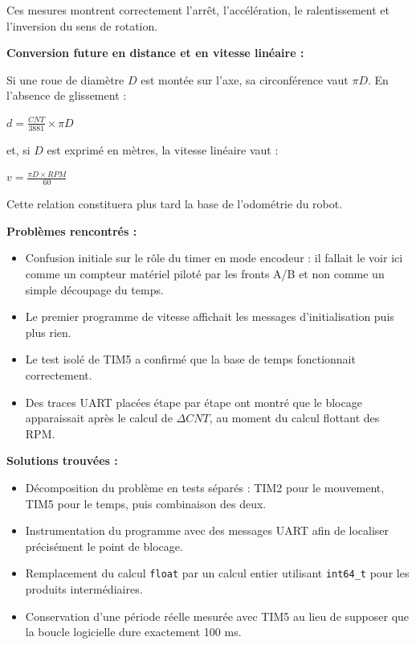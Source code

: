 \documentclass[11pt,a4paper]{article}
\begin{document}
\begin{sessionbox}
		Ces mesures montrent correctement l'arrêt, l'accélération, le ralentissement et l'inversion du sens de rotation.
		
		\vspace{0.3cm}
		
		\textbf{Conversion future en distance et en vitesse linéaire :}
		
		Si une roue de diamètre $D$ est montée sur l'axe, sa circonférence vaut $\pi D$. En l'absence de glissement :
		
		\begin{center}
			$d = \frac{CNT}{3881} \times \pi D$
		\end{center}
		
		et, si $D$ est exprimé en mètres, la vitesse linéaire vaut :
		
		\begin{center}
			$v = \frac{\pi D \times RPM}{60}$
		\end{center}
		
		Cette relation constituera plus tard la base de l'odométrie du robot.
		
		\vspace{0.3cm}
		
		\textbf{Problèmes rencontrés :}
		
		\begin{itemize}
			\item Confusion initiale sur le rôle du timer en mode encodeur : il fallait le voir ici comme un compteur matériel piloté par les fronts A/B et non comme un simple découpage du temps.
			\item Le premier programme de vitesse affichait les messages d'initialisation puis plus rien.
			\item Le test isolé de TIM5 a confirmé que la base de temps fonctionnait correctement.
			\item Des traces UART placées étape par étape ont montré que le blocage apparaissait après le calcul de $\Delta CNT$, au moment du calcul flottant des RPM.
		\end{itemize}
		
		\vspace{0.3cm}
		
		\textbf{Solutions trouvées :}
		
		\begin{itemize}
			\item Décomposition du problème en tests séparés : TIM2 pour le mouvement, TIM5 pour le temps, puis combinaison des deux.
			\item Instrumentation du programme avec des messages UART afin de localiser précisément le point de blocage.
			\item Remplacement du calcul \texttt{float} par un calcul entier utilisant \texttt{int64\_t} pour les produits intermédiaires.
			\item Conservation d'une période réelle mesurée avec TIM5 au lieu de supposer que la boucle logicielle dure exactement 100 ms.
		\end{itemize}
		

\end{sessionbox}
\end{document}

